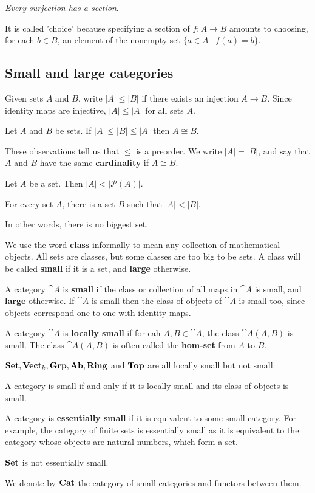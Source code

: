 \smallskip \textit{Every surjection has a section}.\smallskip

It is called 'choice' because specifying a section of $f:A\to B$ amounts to choosing, for each $b\in B$, an element of the nonempty set $\{ a\in A\mid f(a)=b \}$.

\subsection{Small and large categories}
Given sets $A$ and $B$, write $\vert A\vert\leq\vert B\vert$ if there exists an injection $A\to B$. Since identity maps are injective, $\vert A\vert\leq\vert A\vert$ for all sets $A$.
\begin{theorem}
    Let $A$ and $B$ be sets. If $\vert A\vert\leq\vert B\vert\leq\vert A\vert$ then $A\cong B$.
\end{theorem}
These observations tell us that $\leq$ is a preorder. We write $\vert A\vert = \vert B\vert$, and say that $A$ and $B$ have the same \textbf{cardinality} if $A\cong B$.

\begin{theorem}
    Let $A$ be a set. Then $\vert A\vert < \vert \mathcal{P}(A)\vert$.
\end{theorem}

\begin{corollary}
    For every set $A$, there is a set $B$ such that $\vert A\vert < \vert B\vert$.
\end{corollary}
In other words, there is no biggest set.\par

We use the word \textbf{class} informally to mean any collection of mathematical objects. All sets are classes, but some classes are too big to be sets. A class will be called \textbf{small} if it is a set, and \textbf{large} otherwise.\par
A category $\cat{A}$ is \textbf{small} if the class or collection of all maps in $\cat{A}$ is small, and \textbf{large} otherwise. If $\cat{A}$ is small then the class of objects of $\cat{A}$ is small too, since objects correspond one-to-one with identity maps.\par
A category $\cat{A}$ is \textbf{locally small} if for eah $A, B\in\cat{A}$, the class $\cat{A}(A,B)$ is small. The class $\cat{A}(A,B)$ is often called the \textbf{hom-set} from $A$ to $B$.

\begin{example}
    $\mathbf{Set}, \mathbf{Vect}_k, \mathbf{Grp}, \mathbf{Ab}, \mathbf{Ring}$ and $\mathbf{Top}$ are all locally small but not small.
\end{example}
A category is small if and only if it is locally small and its class of objects is small.\par
A category is \textbf{essentially small} if it is equivalent to some small category. For example, the category of finite sets is essentially small as it is equivalent to the category whose objects are natural numbers, which form a set.\par

\begin{proposition}
    $\mathbf{Set}$ is not essentially small.
\end{proposition}

\begin{definition}
    We denote by $\mathbf{Cat}$ the category of small categories and functors between them.
\end{definition}
